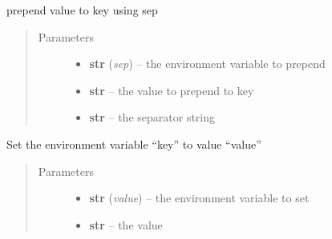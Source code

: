 \documentclass[a4paper,10pt,english]{sphinxmanual}
\begin{document}
\begin{fulllineitems}
\begin{fulllineitems}
\label{commands/apidoc/src:src.fileEnviron.LauncherFileEnviron.prepend_value}
prepend value to key using sep
\begin{quote}\begin{description}
\item[{Parameters}] \leavevmode\begin{itemize}
\item {} 
\textbf{str} (\emph{sep}) -- the environment variable to prepend

\item {} 
\textbf{str} -- the value to prepend to key

\item {} 
\textbf{str} -- the separator string

\end{itemize}

\end{description}\end{quote}

\end{fulllineitems}


\begin{fulllineitems}
\label{commands/apidoc/src:src.fileEnviron.LauncherFileEnviron.set}
Set the environment variable ``key'' to value ``value''
\begin{quote}\begin{description}
\item[{Parameters}] \leavevmode\begin{itemize}
\item {} 
\textbf{str} (\emph{value}) -- the environment variable to set

\item {} 
\textbf{str} -- the value

\end{itemize}

\end{description}\end{quote}

\end{fulllineitems}


\end{fulllineitems}
\end{document}
